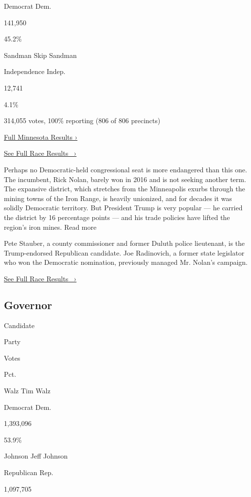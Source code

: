 Democrat Dem.

141,950

45.2\%

 Sandman Skip Sandman

Independence Indep.

12,741

4.1\%

314,055 votes, 100\% reporting (806 of 806 precincts)

\href{https://www.nytimes3xbfgragh.onion/interactive/2018/11/06/us/elections/results-minnesota-elections.html}{Full
Minnesota Results ›}

\href{https://www.nytimes3xbfgragh.onion/elections/results/minnesota-house-district-8}{See
Full Race Results~ ›}

Perhaps no Democratic-held congressional seat is more endangered than
this one. The incumbent, Rick Nolan, barely won in 2016 and is not
seeking another term. The expansive district, which stretches from the
Minneapolis exurbs through the mining towns of the Iron Range, is
heavily unionized, and for decades it was solidly Democratic territory.
But President Trump is very popular --- he carried the district by 16
percentage points --- and his trade policies have lifted the region's
iron mines. Read more

Pete Stauber, a county commissioner and former Duluth police lieutenant,
is the Trump-endorsed Republican candidate. Joe Radinovich, a former
state legislator who won the Democratic nomination, previously managed
Mr. Nolan's campaign.

\href{https://www.nytimes3xbfgragh.onion/elections/results/minnesota-house-district-8}{See
Full Race Results~ ›}

\hypertarget{governor}{%
\subsection{Governor}\label{governor}}

Candidate

Party

Votes

Pct.

 Walz Tim Walz

Democrat Dem.

1,393,096

53.9\%

 Johnson Jeff Johnson

Republican Rep.

1,097,705

